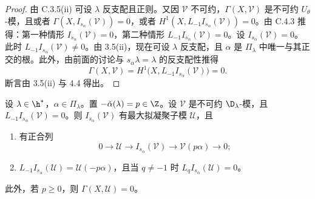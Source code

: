 \begin{proof}
由 C.3.5(ii) 可设 $\lambda$ 反支配且正则。又因 $\mathcal{V}$ 不可约，$\Gamma(X,\mathcal{V})$ 是不可约 $U_\theta$-模，且或者 $\Gamma(X,I_{s_\alpha}(\mathcal{V}))=0$，或者 $H^1(X,L_{-1}I_{s_\alpha}(\mathcal{V}))=0$。由 C.4.3 推得：第一种情形 $I_{s_\alpha}(\mathcal{V})=0$，第二种情形 $L_{-1}I_{s_\alpha}(\mathcal{V})=0$。设 $I_{s_\alpha}(\mathcal{V})=0$。此时 $L_{-1}I_{s_\alpha}(\mathcal{V})\ne 0$。由 3.5(ii)，现在可设 $\lambda$ 反支配，且 $\alpha$ 是 $\Pi_\lambda$ 中唯一与其正交的根。此外，由前面的讨论与 $s_\alpha\lambda=\lambda$ 的反支配性推得
$$\Gamma(X,\mathcal{V})=H^1\bigl(X,L_{-1}I_{s_\alpha}(\mathcal{V})\bigr)=0.$$
断言由 3.5(ii) 与 4.4 得出。
\end{proof}

\begin{lemma}\label{lem:03.5.7}
设 $\lambda\in\h^*$，$\alpha\in\Pi_\lambda$。置 $-\check{\alpha}(\lambda)=p\in\Z$。设 $\mathcal{V}$ 是不可约 $\D_\lambda$-模，且 $L_{-1}I_{s_\alpha}(\mathcal{V})=0$。则 $I_{s_\alpha}(\mathcal{V})$ 有最大拟凝聚子模 $\mathcal{U}$，且
\begin{enumerate}[label=(\roman*)]
\item 有正合列
$$0\longrightarrow\mathcal{U}\longrightarrow I_{s_\alpha}(\mathcal{V})\longrightarrow\mathcal{V}(p\alpha)\longrightarrow 0;$$
\item $L_{-1}I_{s_\alpha}(\mathcal{U})=\mathcal{U}(-p\alpha)$，且当 $q\ne-1$ 时 $L_qI_{s_\alpha}(\mathcal{U})=0$。
\end{enumerate}
此外，若 $p\ge 0$，则 $\Gamma(X,\mathcal{U})=0$。
\end{lemma}

